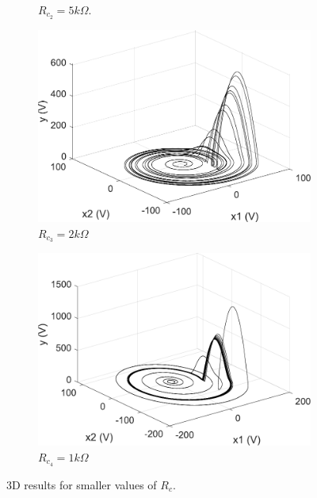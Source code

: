 \begin{figure}
\begin{subfigure}[b]{0.22\textwidth}
            \caption{$R_{c_2} = 5k\Omega$.}  
        \end{subfigure}
        \begin{subfigure}[b]{0.22\textwidth}   
            \centering 
            \includegraphics[scale=0.28]{figs/paraCdown/3dParaC2.pdf}
            \caption{$R_{c_3} = 2k\Omega$}    
        \end{subfigure}
        \begin{subfigure}[b]{0.22\textwidth}   
            \centering 
            \includegraphics[scale=0.28]{figs/paraCdown/3dParaC1.pdf}
            \caption{$R_{c_4} = 1k\Omega$}
        \end{subfigure}
        \caption{3D results for smaller values of $R_c$.} 
        \label{fig:3dparaCvarDown}
	\end{figure}
	
